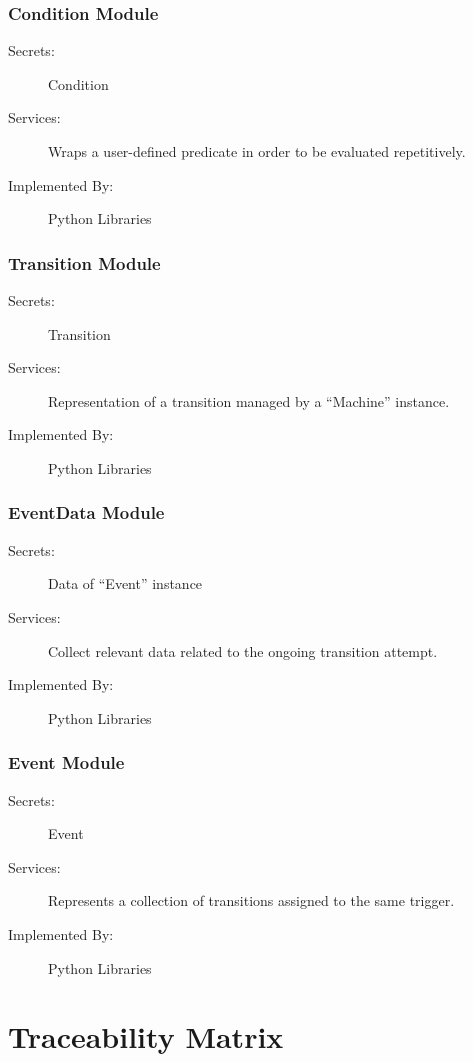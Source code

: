\documentclass[12pt, titlepage]{article}
\begin{document}
\subsubsection{Condition Module}
\begin{description}
\item[Secrets:]Condition
\item[Services:]Wraps a user-defined predicate in order to be evaluated repetitively.
\item[Implemented By:] Python Libraries
\end{description}

\subsubsection{Transition Module}
\begin{description}
\item[Secrets:]Transition
\item[Services:]Representation of a transition managed by a ``Machine'' instance.
\item[Implemented By:] Python Libraries
\end{description}

\subsubsection{EventData Module}
\begin{description}
\item[Secrets:]Data of ``Event'' instance
\item[Services:]Collect relevant data related to the ongoing transition attempt.
\item[Implemented By:] Python Libraries
\end{description}

\subsubsection{Event Module}
\begin{description}
\item[Secrets:]Event
\item[Services:]Represents a collection of transitions assigned to the same trigger.
\item[Implemented By:]Python Libraries
\end{description}
\section{Traceability Matrix} \label{SecTM}
\end{document}
